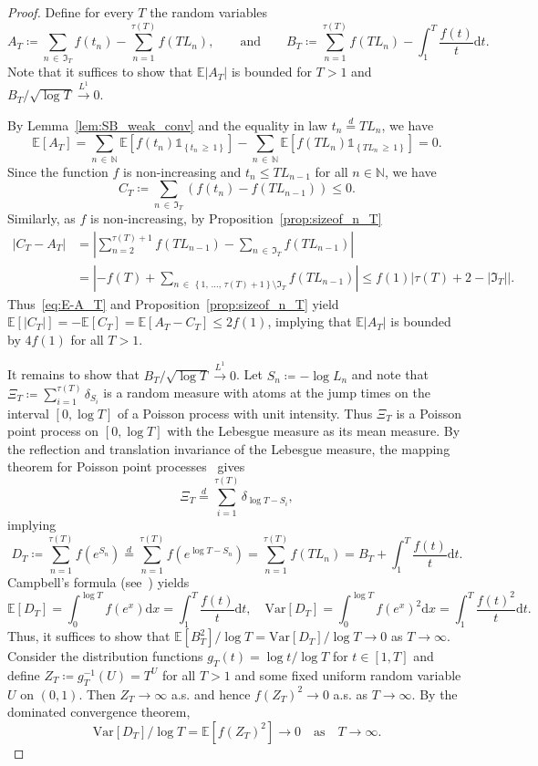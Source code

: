 \documentclass[10pt]{amsart}
\theoremstyle{definition}\newtheorem{defi}[theo]{Definition}\newtheorem{rema}[theo]{Remark}\newtheorem{exam}[theo]{Example}\newtheorem{exem}[theo]{Example}\newtheorem{nota}[theo]{Notation}
\newcommand\N{\mathbb{N}}
\newcommand\E{\mathds{E}}
\newcommand\1{\mathds{1}}
\newcommand\D{\mathrm{d}}
\newcommand\GI{\mathfrak{I}}
\newcommand\eqd{\overset{d}{=}}
\newcommand\ciL{\xrightarrow{L^1}}
\newcommand\Var{\mbox{Var}}
\begin{document}
\begin{proof}
Define for every $T$ the random variables
\[
A_T\coloneqq \sum_{n\,\in\,\GI_T}f(t_n) -\sum_{n=1}^{\tau(T)}f(TL_{n}),
\qquad\text{and}\qquad B_T\coloneqq \sum_{n=1}^{\tau(T)}f\left(TL_{n}\right) -\int_1^T \frac{f(t)}{t}\D t.
\]
Note that it suffices to show that $\E|A_T|$ is bounded for $T>1$ and $B_T/\sqrt{\log T}\ciL 0$.

By Lemma~\ref{lem:SB_weak_conv} and the equality in law $t_n\eqd TL_n$, we have
\begin{equation}\label{eq:E-A_T}
\E[A_T] =\sum_{n\,\in\,\N}\E\left[f(t_n)\1_{\left\{t_n\,\ge\,1\right\}}\right] -\sum_{n\,\in\,\N}\E\left[f\left(TL_n\right)\1_{\left\{TL_n\,\ge\,1\right\}}\right] =0.
\end{equation}
Since the function $f$ is non-increasing and $t_n\leq T L_{n-1}$ for all $n\in\N$, we have 
\[
C_T\coloneqq \sum_{n\,\in\,\GI_T}\left(f(t_n)-f(TL_{n-1})\right)\le 0.
\]
Similarly, as $f$ is non-increasing, by Proposition~\ref{prop:sizeof_n_T}
\begin{align*}
\left|C_T-A_T\right| &=\left|\sum_{n=2}^{\tau(T)+1}f\left(TL_{n-1}\right) -\sum_{n\,\in\,\GI_T}f\left(TL_{n-1}\right)\right|\\
&=\left|-f(T)+\sum_{n\,\in\,\left\{1,\,\ldots,\,\tau(T)+1\right\}\setminus \GI_T}f\left(TL_{n-1}\right)\right|
\le f(1)\big|\tau(T)+2-\left|\GI_T\right|\big|.
\end{align*}
Thus~\eqref{eq:E-A_T} and Proposition~\ref{prop:sizeof_n_T} yield $\E[|C_T|]=-\E[C_T]=\E[A_T-C_T]\le 2f(1)$, implying that $\E|A_T|$ is bounded by $4f(1)$ for all $T>1$.

It remains to show that $B_T/\sqrt{\log T}\ciL 0$. Let $S_n\coloneqq-\log L_n$ and note that $\Xi_T\coloneqq\sum_{i=1}^{\tau(T)}\delta_{S_i}$ is a random measure with atoms at the jump times on the interval $[0,\log T]$ of a Poisson process with unit intensity. Thus $\Xi_T$ is a Poisson point process on $[0,\log T]$ with the Lebesgue measure as its mean measure. By the reflection and translation invariance of the Lebesgue measure, the mapping theorem for Poisson point processes~\cite[Section~2.3]{MR1207584} gives
\[
\Xi_T\eqd\sum_{i=1}^{\tau(T)}\delta_{\log T-S_i},
\]
implying
\[
D_T\coloneqq \sum_{n=1}^{\tau(T)}f\left(e^{S_n}\right)
\eqd\sum_{n=1}^{\tau(T)}f\left(e^{\log T-S_n}\right) =\sum_{n=1}^{\tau(T)}f(TL_n) =B_T+\int_1^T \frac{f(t)}{t}\D t.
\]
Campbell's formula (see~\cite[p.~28]{MR1207584}) yields
\[
\E[D_T]=\int_0^{\log T}f(e^x)\D x =\int_1^T\frac{f(t)}{t}\D t,
\quad
\Var[D_T]=\int_0^{\log T}f(e^x)^2\D x =\int_1^T\frac{f(t)^2}{t}\D t.
\]
Thus, it suffices to show that $\E[B_T^2]/\log T=\Var[D_T]/\log T \to 0$ as $T \to \infty$. Consider the distribution functions $g_T(t)=\log t/\log T$ for $t\in[1,T]$ and define $Z_T\coloneqq g_T^{-1}(U)=T^U$ for all $T>1$ and some fixed uniform random variable $U$ on $(0,1)$. Then $Z_T\to\infty$ a.s. and hence $f(Z_T)^2\to 0$ a.s. as $T\to\infty$. By the dominated convergence theorem,
\[
\Var[D_T]/\log T=\E\left[f\left(Z_T\right)^2\right]\to 0\quad\text{as}\quad T \to \infty.
\]
\end{proof}
\end{document}
